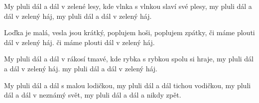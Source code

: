 
\beginverse{}
My pluli dál a dál v zelené lesy,
kde vlnka s vlnkou slaví své plesy,
my pluli dál a dál v zelený háj,
my pluli dál a dál v zelený háj.
\endverse{}

\beginverse{}
\chordsoff{}
Loďka je malá, vesla jsou krátký,
poplujem hoši, poplujem zpátky,
či máme plouti dál v zelený háj.
či máme plouti dál v zelený háj.
\chordson{}
\endverse{}

\beginverse{}
\chordsoff{}
My pluli dál a dál v rákosí tmavé,
kde rybka s rybkou spolu si hraje,
my pluli dál a dál v zelený háj.
my pluli dál a dál v zelený háj.
\chordson{}
\endverse{}

\beginverse{}
\chordsoff{}
My pluli dál a dál s malou lodičkou,
my pluli dál a dál tichou vodičkou,
my pluli dál a dál v neznámý svět,
my pluli dál a dál a nikdy zpět.
\chordson{}
\endverse{}

\endsong{}
